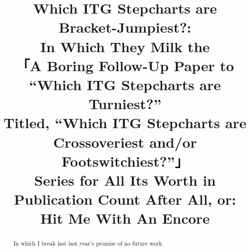 \documentclass[10pt]{sigplanconf}
\begin{document}
\copyrightdata{}


\title{
Which ITG Stepcharts are Bracket-Jumpiest?: \\
In Which They Milk the \\
「A Boring Follow-Up Paper to \\
``Which ITG Stepcharts are Turniest?'' \\
Titled, ``Which ITG Stepcharts are Crossoveriest and/or Footswitchiest?''」\\
Series for All Its Worth in Publication Count After All, or: \\
Hit Me With An Encore
}


\maketitle

\begin{abstract}

In which I break last last year's promise of no future work.

\end{abstract}
\end{document}
